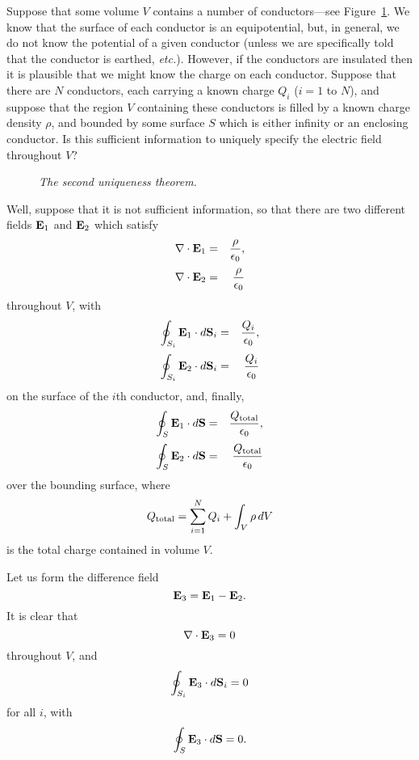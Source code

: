 Suppose that some volume $V$  contains a number of conductors---see Figure~\ref{funq1}. We know that the
surface of each conductor is an equipotential, but, in general, we do not
know the potential of a given conductor  (unless we are specifically told that
the conductor is earthed, {\em etc.}). However, if the conductors are insulated then it is
plausible that we might know the charge on each conductor. Suppose that
there are $N$ conductors, each carrying a known charge $Q_i$ ($i=1$ to $N$), and suppose
that the region $V$ containing these conductors is filled by a known charge
density $\rho$, and bounded by some surface $S$ which is either infinity or
an enclosing conductor. Is this sufficient information to uniquely
specify the electric field throughout $V$?
\begin{figure}
\epsfysize=2.25in
\centerline{}
\caption{\em The second uniqueness theorem.}\label{funq1}
\end{figure}

Well, suppose that it is not  sufficient information, so that there are two different
fields ${\bf E}_1$ and ${\bf E}_2$ which satisfy 
\begin{eqnarray}
\nabla\cdot{\bf E}_1& =& \frac{\rho}{\epsilon_0},\\[0.5ex]
\nabla\cdot{\bf E}_2 &= &\frac{\rho}{\epsilon_0}
\end{eqnarray}
throughout $V$, with
\begin{eqnarray}
\oint_{S_i} {\bf E}_1\cdot d{\bf S}_i &=& \frac{Q_i}{\epsilon_0},\\[0.5ex]
\oint_{S_i} {\bf E}_2\cdot d{\bf S}_i &=& \frac{Q_i} {\epsilon_0}
\end{eqnarray}
on the surface of the $i$th conductor, and, finally,
\begin{eqnarray}
\oint_{S} {\bf E}_1\cdot d{\bf S} &=& \frac{Q_{\rm total}}{\epsilon_0},
\\[0.5ex]
\oint_{S} {\bf E}_2\cdot d{\bf S} &=& \frac{Q_{\rm total}} {\epsilon_0}
\end{eqnarray}
over the bounding surface, 
where
\begin{equation}
Q_{\rm total} = \sum_{i=1}^N Q_i + \int_V \rho\,dV
\end{equation}
is the total charge contained in volume $V$. 

Let us form the difference field
\begin{equation}
{\bf E}_3 = {\bf E}_1 - {\bf E}_2.
\end{equation}
It is clear that 
\begin{equation}
\nabla\cdot {\bf E}_3 = 0
\end{equation}
throughout $V$, and
\begin{equation}\label{e5.103}
\oint_{S_i} {\bf E}_3 \cdot d{\bf S}_i = 0
\end{equation}
for all $i$, with
\begin{equation}\label{e5.104}
\oint_S {\bf E}_3 \cdot d{\bf S} = 0.
\end{equation}

